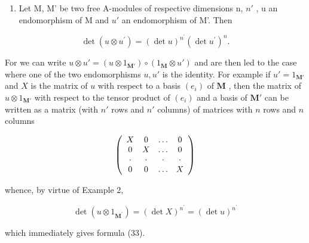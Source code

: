 \begin{enumerate}
\def\labelenumi{(\arabic{enumi})}
\setcounter{enumi}{2}
\tightlist
\item
  Let M, M' be two free A-modules of respective dimensions n, \(n'\) , u an endomorphism of M and \(u'\) an endomorphism of M'. Then
\end{enumerate}

\[
\det (u \otimes u ^ {\prime}) = (\det u) ^ {n ^ {\prime}} (\det u ^ {\prime}) ^ {n}.\tag{33}
\]

For we can write \(u \otimes u' = (u \otimes 1_{\mathbf{M}'}) \circ (1_{\mathbf{M}} \otimes u')\) and are then led to the case where one of the two endomorphisms \(u, u'\) is the identity. For example if \(u' = 1_{\mathbf{M}'}\) and \(X\) is the matrix of \(u\) with respect to a basis \((e_i)\) of \(\mathbf{M}\) , then the matrix of \(u \otimes 1_{\mathbf{M}'}\) with respect to the tensor product of \((e_i)\) and a basis of \(\mathbf{M}'\) can be written as a matrix (with \(n'\) rows and \(n'\) columns) of matrices with \(n\) rows and \(n\) columns

\[
\left( \begin{array}{c c c c} X & 0 & \ldots & 0 \\ 0 & X & \ldots & 0 \\ \cdot & \cdot & \cdot & \cdot \\ 0 & 0 & \ldots & X \end{array} \right)
\]

whence, by virtue of Example 2,

\[
\det (u \otimes 1 _ {\mathbf {M} ^ {\prime}}) = (\det X) ^ {n ^ {\prime}} = (\det u) ^ {n ^ {\prime}}
\]

which immediately gives formula (33).

